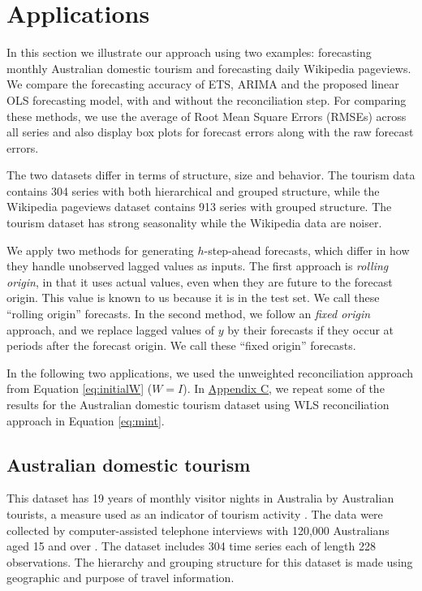 \documentclass[11pt,a4paper,]{article}
\begin{document}
\hypertarget{applications}{%
\section{Applications}\label{applications}}

In this section we illustrate our approach using two examples:
forecasting monthly Australian domestic tourism and forecasting daily
Wikipedia pageviews. We compare the forecasting accuracy of ETS, ARIMA
and the proposed linear OLS forecasting model, with and without the
reconciliation step. For comparing these methods, we use the average of
Root Mean Square Errors (RMSEs) across all series and also display box
plots for forecast errors along with the raw forecast errors.

The two datasets differ in terms of structure, size and behavior. The
tourism data contains 304 series with both hierarchical and grouped
structure, while the Wikipedia pageviews dataset contains 913 series
with grouped structure. The tourism dataset has strong seasonality while
the Wikipedia data are noiser.

We apply two methods for generating \(h\)-step-ahead forecasts, which
differ in how they handle unobserved lagged values as inputs. The first
approach is \emph{rolling origin}, in that it uses actual values, even
when they are future to the forecast origin. This value is known to us
because it is in the test set. We call these ``rolling origin''
forecasts. In the second method, we follow an \emph{fixed origin}
approach, and we replace lagged values of \(y\) by their forecasts if
they occur at periods after the forecast origin. We call these ``fixed
origin'' forecasts.

In the following two applications, we used the unweighted reconciliation
approach from Equation \eqref{eq:initialW} (\(W=I\)). In
\protect\hyperlink{appendixC}{Appendix C}, we repeat some of the results
for the Australian domestic tourism dataset using WLS reconciliation
approach in Equation \eqref{eq:mint}.

\hypertarget{australian-domestic-tourism}{%
\subsection{Australian domestic
tourism}\label{australian-domestic-tourism}}

This dataset has 19 years of monthly visitor nights in Australia by
Australian tourists, a measure used as an indicator of tourism activity
\autocite{mint2018}. The data were collected by computer-assisted
telephone interviews with 120,000 Australians aged 15 and over
\autocite{researchAustralia2005}. The dataset includes 304 time series
each of length 228 observations. The hierarchy and grouping structure
for this dataset is made using geographic and purpose of travel
information.
\end{document}
